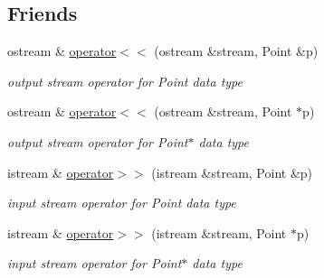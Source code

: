 \subsection*{Friends}
\begin{DoxyCompactItemize}
\item 
\hypertarget{classfwi_1_1grid_1_1Grid_a3d70a0064502ecd7311f33a9bd4ab742}{ostream \& \hyperlink{classfwi_1_1grid_1_1Grid_a3d70a0064502ecd7311f33a9bd4ab742}{operator$<$$<$} (ostream \&stream, Point \&p)}\label{classfwi_1_1grid_1_1Grid_a3d70a0064502ecd7311f33a9bd4ab742}

\begin{DoxyCompactList}\small\item\em output stream operator for Point data type \end{DoxyCompactList}\item 
\hypertarget{classfwi_1_1grid_1_1Grid_ac61dcfaea1a3b9d1fa2b0d36ab6f4c4e}{ostream \& \hyperlink{classfwi_1_1grid_1_1Grid_ac61dcfaea1a3b9d1fa2b0d36ab6f4c4e}{operator$<$$<$} (ostream \&stream, Point $\ast$p)}\label{classfwi_1_1grid_1_1Grid_ac61dcfaea1a3b9d1fa2b0d36ab6f4c4e}

\begin{DoxyCompactList}\small\item\em output stream operator for Point$\ast$ data type \end{DoxyCompactList}\item 
\hypertarget{classfwi_1_1grid_1_1Grid_a34fd445257de6bd999e8155057e359f7}{istream \& \hyperlink{classfwi_1_1grid_1_1Grid_a34fd445257de6bd999e8155057e359f7}{operator$>$$>$} (istream \&stream, Point \&p)}\label{classfwi_1_1grid_1_1Grid_a34fd445257de6bd999e8155057e359f7}

\begin{DoxyCompactList}\small\item\em input stream operator for Point data type \end{DoxyCompactList}\item 
\hypertarget{classfwi_1_1grid_1_1Grid_a4c7faad19237f45792c62de03a47e448}{istream \& \hyperlink{classfwi_1_1grid_1_1Grid_a4c7faad19237f45792c62de03a47e448}{operator$>$$>$} (istream \&stream, Point $\ast$p)}\label{classfwi_1_1grid_1_1Grid_a4c7faad19237f45792c62de03a47e448}

\begin{DoxyCompactList}\small\item\em input stream operator for Point$\ast$ data type \end{DoxyCompactList}\end{DoxyCompactItemize}


